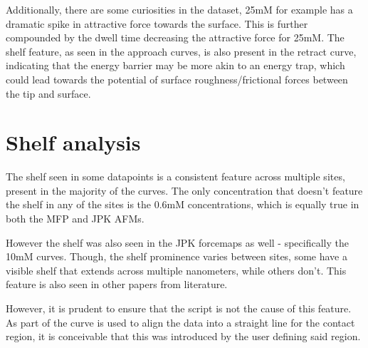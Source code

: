 Additionally, there are some curiosities in the dataset, 25mM for example has a dramatic spike in attractive force towards the surface. This is further compounded by the dwell time decreasing the attractive force for 25mM. The shelf feature, as seen in the approach curves, is also present in the retract curve, indicating that the energy barrier may be more akin to an energy trap, which could lead towards the potential of surface roughness/frictional forces between the tip and surface.

\section{Shelf analysis}

The shelf seen in some datapoints is a consistent feature across multiple sites, present in the majority of the curves. The only concentration that doesn't feature the shelf in any of the sites is the 0.6mM concentrations, which is equally true in both the MFP and JPK AFMs.

However the shelf was also seen in the JPK forcemaps as well - specifically the 10mM curves. Though, the shelf prominence varies between sites, some have a visible shelf that extends across multiple nanometers, while others don't. This feature is also seen in other papers from literature.\cite{guleryuz2012afm}

However, it is prudent to ensure that the script is not the cause of this feature. As part of the curve is used to align the data into a straight line for the contact region, it is conceivable that this was introduced by the user defining said region.

